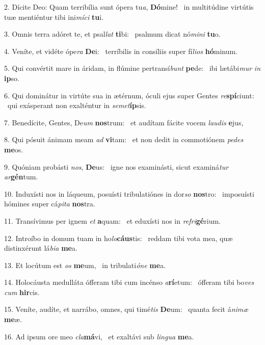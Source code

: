 2. Dícite Deo: Quam terribília sunt ópera tu\textit{a}, \textbf{Dó}mine! \ast\  in multitúdine virtútis tuæ mentiéntur tibi ini\textit{mí}\textit{ci} \textbf{tu}i.\

3. Omnis terra adóret te, et psal\textit{lat} \textbf{ti}bi: \ast\  psalmum dicat nó\textit{mi}\textit{ni} \textbf{tu}o.\

4. Veníte, et vidéte ópe\textit{ra} \textbf{De}i: \ast\  terríbilis in consíliis super fí\textit{li}\textit{os} \textbf{hó}minum.\

5. Qui convértit mare in áridam, in flúmine pertransí\textit{bunt} \textbf{pe}de: \ast\  ibi lætábi\textit{mur} \textit{in} \textbf{ip}so.\

6. Qui dominátur in virtúte sua in ætérnum, óculi ejus super Gentes \textit{re}\textbf{spí}ciunt: \ast\  qui exásperant non exalténtur in \textit{se}\textit{met}\textbf{íp}sis.\

7. Benedícite, Gentes, De\textit{um} \textbf{nos}trum: \ast\  et audítam fácite vocem \textit{lau}\textit{dis} \textbf{e}jus,\

8. Qui pósuit ánimam meam \textit{ad} \textbf{vi}tam: \ast\  et non dedit in commotiónem \textit{pe}\textit{des} \textbf{me}os.\

9. Quóniam probásti \textit{nos}, \textbf{De}us: \ast\  igne nos examinásti, sicut examiná\textit{tur} \textit{ar}\textbf{gén}tum.\

10. Induxísti nos in láqueum, posuísti tribulatiónes in dor\textit{so} \textbf{nos}tro: \ast\  imposuísti hómines super cá\textit{pi}\textit{ta} \textbf{nos}tra.\

11. Transívimus per ignem \textit{et} \textbf{a}quam: \ast\  et eduxísti nos in \textit{re}\textit{fri}\textbf{gé}rium.\

12. Introíbo in domum tuam in ho\textit{lo}\textbf{cáus}tis: \ast\  reddam tibi vota mea, quæ distinxérunt lá\textit{bi}\textit{a} \textbf{me}a.\

13. Et locútum est \textit{os} \textbf{me}um, \ast\  in tribulati\textit{ó}\textit{ne} \textbf{me}a.\

14. Holocáusta medulláta ófferam tibi cum incénso \textit{a}\textbf{rí}etum: \ast\  ófferam tibi bo\textit{ves} \textit{cum} \textbf{hir}cis.\

15. Veníte, audíte, et narrábo, omnes, qui timé\textit{tis} \textbf{De}um: \ast\  quanta fecit á\textit{ni}\textit{mæ} \textbf{me}æ.\

16. Ad ipsum ore meo \textit{cla}\textbf{má}vi, \ast\  et exaltávi sub \textit{lin}\textit{gua} \textbf{me}a.\

